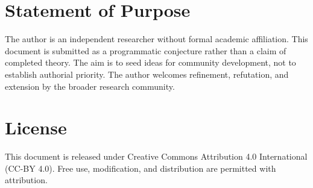 \documentclass[11pt,a4paper]{article}
\begin{document}
\section*{Statement of Purpose}

The author is an independent researcher without formal academic affiliation. This document is submitted as a programmatic conjecture rather than a claim of completed theory. The aim is to seed ideas for community development, not to establish authorial priority. The author welcomes refinement, refutation, and extension by the broader research community.

\section*{License}

This document is released under Creative Commons Attribution 4.0 International (CC-BY 4.0). Free use, modification, and distribution are permitted with attribution.
\end{document}

